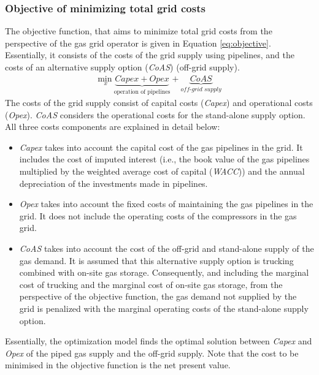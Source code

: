 \subsubsection{Objective of minimizing total grid costs}
The objective function, that aims to minimize total grid costs from the perspective of the gas grid operator is given in Equation \ref{eq:objective}. Essentially, it consists of the costs of the grid supply using pipelines, and the costs of an alternative supply option (\textit{CoAS}) (off-grid supply). 
\begin{align}\label{eq:objective}
	\underset{x}{\mathrm{min~}} \underbrace{Capex + Opex}_{\text{operation of pipelines}} + \underbrace{CoAS}_{\textit{off-grid supply}}
\end{align}
The costs of the grid supply consist of capital costs (\textit{Capex}) and operational costs (\textit{Opex}). \textit{CoAS} considers the operational costs for the stand-alone supply option. All three costs components are explained in detail below: 

\begin{itemize}
	\item \textit{Capex} takes into account the capital cost of the gas pipelines in the grid. It includes the cost of imputed interest (i.e., the book value of the gas pipelines multiplied by the weighted average cost of capital (\textit{WACC})) and the annual depreciation of the investments made in pipelines. 
	\item \textit{Opex} takes into account the fixed costs of maintaining the gas pipelines in the grid. It does not include the operating costs of the compressors in the gas grid. 
	\item \textit{CoAS} takes into account the cost of the off-grid and stand-alone supply of the gas demand. It is assumed that this alternative supply option is trucking combined with on-site gas storage. Consequently, and including the marginal cost of trucking and the marginal cost of on-site gas storage, from the perspective of the objective function, the gas demand not supplied by the grid is penalized with the marginal operating costs of the stand-alone supply option. 
\end{itemize}

Essentially, the optimization model finds the optimal solution between \textit{Capex} and \textit{Opex} of the piped gas supply and the off-grid supply. Note that the cost to be minimised in the objective function is the net present value.


